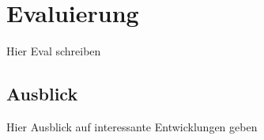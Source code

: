 \chapter{Evaluierung}\label{eval}
Hier Eval schreiben
\section{Ausblick}
Hier Ausblick auf interessante Entwicklungen geben